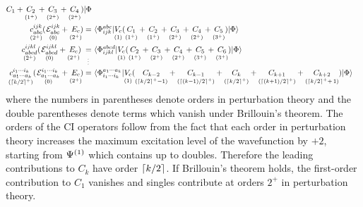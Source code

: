 \documentclass[11pt]{article}
\numberwithin{equation}{section}
\begin{document}
\begin{rmk}
\begin{align}
{{      C_1
    }
    +
    \underset{(1^+)}{\vphantom{(}
      C_2
    }
    +
    \underset{(2^+)}{\vphantom{(}
      C_3
    }
    +
    \underset{(2^+)}{\vphantom{(}
      C_4
    }
    )
  |\ensuremath{\Phi }}
\\
  \underset{(2^+)}{\vphantom{(}
  c_{abc}^{ijk}
  }
  (\hspace{1pt}
  \underset{(0)}{\vphantom{(}
    \mathcal{E}_{abc}^{ijk}
  }
  +
  \underset{(2^+)}{\vphantom{(}
    E_{\mathrm{c}}
  }
  \hspace{-2pt}
  )
=&\
  \langle\Phi _{ijk}^{abc}|
  \underset{(1)}{\vphantom{(}
    V_{\mathrm{c}}
  }
    (
    \underset{(1^+)}{\vphantom{(}
      C_1
    }
    +
    \underset{(1^+)}{\vphantom{(}
      C_2
    }
    +
    \underset{(2^+)}{\vphantom{(}
      C_3
    }
    +
    \underset{(2^+)}{\vphantom{(}
      C_4
    }
    +
    \underset{(3^+)}{\vphantom{(}
      C_5
    }
    )
  |\Phi \rangle
\\
  \underset{(2^+)}{\vphantom{(}
  c_{abcd}^{ijkl}
  }
  (\hspace{1pt}
  \underset{(0)}{\vphantom{(}
    \mathcal{E}_{abcd}^{ijkl}
  }
  +
  \underset{(2^+)}{\vphantom{(}
    E_{\mathrm{c}}
  }
  \hspace{-2pt}
  )
\underset{\hspace{2pt}\vdots}{\vphantom{(}
=
}&\
  \langle\Phi _{ijkl}^{abcd}|
  \underset{(1)}{\vphantom{(}
    V_{\mathrm{c}}
  }
    (
    \underset{(1^+)}{\vphantom{(}
      C_2
    }
    +
    \underset{(2^+)}{\vphantom{(}
      C_3
    }
    +
    \underset{(2^+)}{\vphantom{(}
      C_4
    }
    +
    \underset{(3^+)}{\vphantom{(}
      C_5
    }
    +
    \underset{(3^+)}{\vphantom{(}
      C_6
    }
    )
  |\Phi \rangle
\\
\label{eq:ci-k-tuples-equation}
  \underset{(\left\lceil k/2\right\rceil^+)}{\vphantom{(}
  c_{a_1\cdots a_k}^{i_1\cdots i_k}
  }
  (\hspace{1pt}
  \underset{(0)}{\vphantom{(}
    \mathcal{E}_{a_1\cdots a_k}^{i_1\cdots i_k}
  }
  +
  \underset{(2^+)}{\vphantom{(}
    E_{\mathrm{c}}
  }
  \hspace{-2pt}
  )
=&\
  \langle\Phi _{i_1\cdots i_k}^{a_1\cdots a_k}|
  \underset{(1)}{\vphantom{(}
    V_{\mathrm{c}}
  }
    (
    \underset{(\left\lceil k/2\right\rceil^+-1)}{\vphantom{(}
      C_{k-2}
    }
    +
    \underset{(\left\lceil(k-1)/2\right\rceil^+)}{\vphantom{(}
      C_{k-1}
    }
    +
    \underset{(\left\lceil k/2\right\rceil^+)}{\vphantom{(}
      C_k
    }
    +
    \underset{(\left\lceil(k+1)/2\right\rceil^+)}{\vphantom{(}
      C_{k+1}
    }
    +
    \underset{(\left\lceil k/2\right\rceil^++\,1)}{\vphantom{(}
      C_{k+2}
    }
    )
  |\Phi \rangle
\end{align}
where the numbers in parentheses denote orders in perturbation theory and the double parentheses denote terms which vanish under Brillouin's theorem.
The orders of the CI operators follow from the fact that each order in perturbation theory increases the maximum excitation level of the wavefunction by $+2$, starting from $\Psi ^{(1)}$ which contains up to doubles.
Therefore the leading contributions to $C_k$ have order $\left\lceil k/2\right\rceil$.
If Brillouin's theorem holds, the first-order contribution to $C_1$ vanishes and singles contribute at orders $2^+$ in perturbation theory.
\end{rmk}
\end{document}
